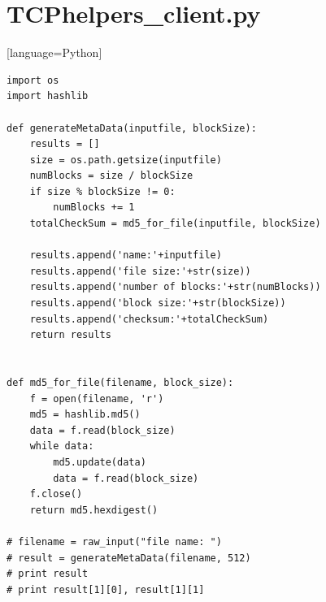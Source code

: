 \documentclass[10pt]{article}
\begin{document}
\section{TCPhelpers\_client.py}[language=Python]
\begin{lstlisting}
import os
import hashlib

def generateMetaData(inputfile, blockSize):
	results = []
	size = os.path.getsize(inputfile)
	numBlocks = size / blockSize 
	if size % blockSize != 0:
		numBlocks += 1
	totalCheckSum = md5_for_file(inputfile, blockSize)

	results.append('name:'+inputfile)
	results.append('file size:'+str(size))
	results.append('number of blocks:'+str(numBlocks))
	results.append('block size:'+str(blockSize))
	results.append('checksum:'+totalCheckSum)
	return results


def md5_for_file(filename, block_size):
	f = open(filename, 'r')
	md5 = hashlib.md5()
	data = f.read(block_size)
	while data:
		md5.update(data)
		data = f.read(block_size)
	f.close()
	return md5.hexdigest()

# filename = raw_input("file name: ")
# result = generateMetaData(filename, 512)
# print result
# print result[1][0], result[1][1]
\end{lstlisting}
\end{document}
